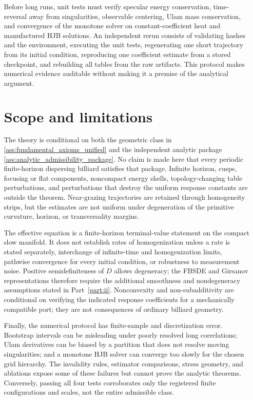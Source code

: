\documentclass[12pt, letterpaper]{amsart}
\theoremstyle{plain}
\theoremstyle{definition}
\theoremstyle{remark}
\begin{document}
Before long runs, unit tests must verify specular energy conservation,
time-reversal away from singularities, observable centering, Ulam mass
conservation, and convergence of the monotone solver on constant-coefficient
heat and manufactured HJB solutions.  An independent rerun consists of
validating hashes and the environment, executing the unit tests, regenerating
one short trajectory from its initial condition, reproducing one coefficient
estimate from a stored checkpoint, and rebuilding all tables from the raw
artifacts.  This protocol makes numerical evidence auditable without making it
a premise of the analytical argument.

\section{Scope and limitations}
\label{sec:limitations}

The theory is conditional on both the geometric class in
\cref{ass:fundamental_axioms_unified} and the independent analytic package
\cref{ass:analytic_admissibility_package}.  No claim is made here that every
periodic finite-horizon dispersing billiard satisfies that package.  Infinite horizon, cusps, focusing or
flat components, noncompact energy shells, topology-changing table
perturbations, and perturbations that destroy the uniform response constants
are outside the theorem.  Near-grazing trajectories are retained through
homogeneity strips, but the estimates are not uniform under degeneration of the
primitive curvature, horizon, or transversality margins.

The effective equation is a finite-horizon terminal-value statement on the
compact slow manifold.  It does not establish rates of homogenization unless a
rate is stated separately, interchange of infinite-time and homogenization
limits, pathwise convergence for every initial condition, or robustness to
measurement noise.  Positive semidefiniteness of $D$ allows degeneracy; the
FBSDE and Girsanov representations therefore require the additional smoothness
and nondegeneracy assumptions stated in Part~\ref{part:ii}.  Nonconvexity and
non-subadditivity are conditional on verifying the indicated response
coefficients for a mechanically compatible port; they are not consequences of
ordinary billiard geometry.

Finally, the numerical protocol has finite-sample and discretization error.
Bootstrap intervals can be misleading under poorly resolved long correlations;
Ulam derivatives can be biased by a partition that does not resolve moving
singularities; and a monotone HJB solver can converge too slowly for the chosen
grid hierarchy.  The invalidity rules, estimator comparisons, stress geometry,
and ablations expose some of these failures but cannot prove the analytic
theorems.  Conversely, passing all four tests corroborates only the registered
finite configurations and scales, not the entire admissible class.
\end{document}

